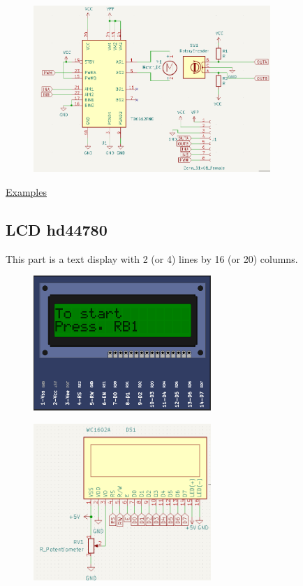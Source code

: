 \begin{figure}[H]
\center
\includegraphics[width=0.8\textwidth]{img/part_dcmotor_.png} 
\end{figure} 

\href{https://lcgamboa.github.io/picsimlab_examples/parts_DC_Motor.html}{Examples}


\subsection{LCD hd44780}

This part is a text display with 2 (or 4) lines by 16 (or 20) columns.

\begin{figure}[H]
\center
\includegraphics[width=0.6\textwidth]{img/part_hd44780_2x16.png} 
\end{figure} 

\begin{figure}[H]
\center
\includegraphics[width=0.6\textwidth]{img/part_hd44780_2x16_.png} 
\end{figure} 


